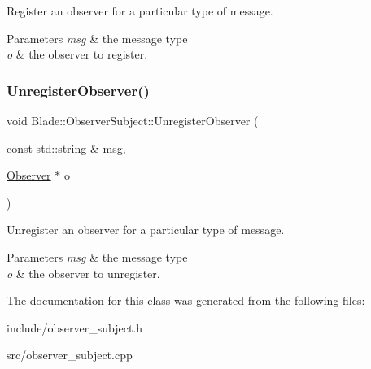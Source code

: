 Register an observer for a particular type of message. 


\begin{DoxyParams}{Parameters}
{\em msg} & the message type \\
\hline
{\em o} & the observer to register. \\
\hline
\end{DoxyParams}
\mbox{\label{class_blade_1_1_observer_subject_a780cc6b90ee1b46fe936a8c712c41a58}} 
\subsubsection{\texorpdfstring{Unregister\+Observer()}{UnregisterObserver()}}
{\footnotesize\ttfamily void Blade\+::\+Observer\+Subject\+::\+Unregister\+Observer (\begin{DoxyParamCaption}\item[{const std\+::string \&}]{msg,  }\item[{\hyperlink{class_blade_1_1_observer}{Observer} $\ast$}]{o }\end{DoxyParamCaption})\hspace{0.3cm}{\ttfamily [noexcept]}}



Unregister an observer for a particular type of message. 


\begin{DoxyParams}{Parameters}
{\em msg} & the message type \\
\hline
{\em o} & the observer to unregister. \\
\hline
\end{DoxyParams}


The documentation for this class was generated from the following files\+:\begin{DoxyCompactItemize}
\item 
include/observer\+\_\+subject.\+h\item 
src/observer\+\_\+subject.\+cpp\end{DoxyCompactItemize}
